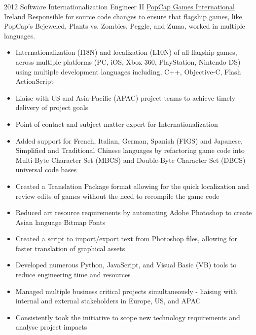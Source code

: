 
\begin{twenty}
  {2012}
  {Software Internationalization Engineer II}
  {\href{https://www.popcap.com/}{PopCap Games International}}
  {Ireland}
  {Responsible for source code changes to ensure that flagship games, like PopCap's Bejeweled, Plants vs. Zombies, Peggle, and Zuma, worked in multiple languages.}
  {\begin{itemize}
    \item Internationalization (I18N) and localization (L10N) of all flagship games, across multiple platforms (PC, iOS, Xbox 360, PlayStation, Nintendo DS) using multiple development languages including, C++, Objective-C, Flash ActionScript
    \item Liaise with US and Asia-Pacific (APAC) project teams to achieve timely delivery of project goals
    \item Point of contact and subject matter expert for Internationalization
  \end{itemize}
  }
  {\begin{itemize}
    \item Added support for French, Italian, German, Spanish (FIGS) and Japanese, Simplified and Traditional Chinese languages by refactoring game code into Multi-Byte Character Set (MBCS) and Double-Byte Character Set (DBCS) universal code bases
    \item Created a Translation Package format allowing for the quick localization and review edits of games without the need to recompile the game code
    \item Reduced art resource requirements by automating Adobe Photoshop to create Asian language Bitmap Fonts
    \item Created a script to import/export text from Photoshop files, allowing for faster translation of graphical assets
    \item Developed numerous Python, JavaScript, and Visual Basic (VB) tools to reduce engineering time and resources
    \item Managed multiple business critical projects simultaneously - liaising with internal and external stakeholders in Europe, US, and APAC
    \item Consistently took the initiative to scope new technology requirements and analyse project impacts
  \end{itemize}
  }
\end{twenty}

